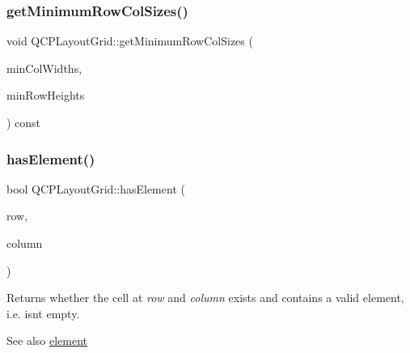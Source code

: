 \mbox{\label{class_q_c_p_layout_grid_a4b9a251919936f127a63fc1b9911cd4e}} 
\subsubsection{\texorpdfstring{getMinimumRowColSizes()}{getMinimumRowColSizes()}}
{\footnotesize\ttfamily void Q\+C\+P\+Layout\+Grid\+::get\+Minimum\+Row\+Col\+Sizes (\begin{DoxyParamCaption}\item[{Q\+Vector$<$ int $>$ $\ast$}]{min\+Col\+Widths,  }\item[{Q\+Vector$<$ int $>$ $\ast$}]{min\+Row\+Heights }\end{DoxyParamCaption}) const\hspace{0.3cm}{\ttfamily [protected]}}

\mbox{\label{class_q_c_p_layout_grid_ab0cf4f7edc9414a3bfaddac0f46dc0a0}} 
\subsubsection{\texorpdfstring{hasElement()}{hasElement()}}
{\footnotesize\ttfamily bool Q\+C\+P\+Layout\+Grid\+::has\+Element (\begin{DoxyParamCaption}\item[{int}]{row,  }\item[{int}]{column }\end{DoxyParamCaption})}

Returns whether the cell at {\itshape row} and {\itshape column} exists and contains a valid element, i.\+e. isn\textquotesingle{}t empty.

\begin{DoxySeeAlso}{See also}
\mbox{\hyperlink{class_q_c_p_layout_grid_a602b426609b4411cf6a93c3ddf3a381a}{element}} 
\end{DoxySeeAlso}
\mbox{\label{class_q_c_p_layout_grid_a577223db920e2acb34bc1091080c76d1}} 

